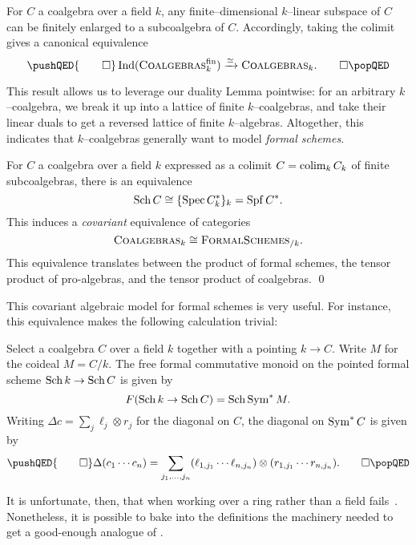 \begin{lemma}\label{kCoalgebrasAreIndFinite}
For \(C\) a coalgebra over a field \(k\), any finite--dimensional \(k\)--linear subspace of \(C\) can be finitely enlarged to a subcoalgebra of \(C\).  Accordingly, taking the colimit gives a canonical equivalence
\[\pushQED{\qed}
\Ind(\CatOf{Coalgebras}_k^{\mathrm{fin}}) \xrightarrow{\simeq} \CatOf{Coalgebras}_k. \qedhere
\popQED\]
\end{lemma}

\noindent This result allows us to leverage our duality Lemma pointwise: for an arbitrary \(k\)--coalgebra, we break it up into a lattice of finite \(k\)--coalgebras, and take their linear duals to get a reversed lattice of finite \(k\)--algebras.  Altogether, this indicates that \(k\)--coalgebras generally want to model \emph{formal schemes}.

\begin{corollary}\label{CoalgsAndFSchsAgreeOverk}
For \(C\) a coalgebra over a field \(k\) expressed as a colimit \(C = \operatorname*{colim}_k C_k\) of finite subcoalgebras, there is an equivalence \[\operatorname{Sch} C \cong \{\operatorname{Spec} C_k^*\}_k = \operatorname{Spf} C^*.\]  This induces a \emph{covariant} equivalence of categories \[\normalfont\textsc{Coalgebras}_k \cong \normalfont\textsc{FormalSchemes}_{/k}.\]  This equivalence translates between the product of formal schemes, the tensor product of pro-algebras, and the tensor product of coalgebras. \qed
\end{corollary}

This covariant algebraic model for formal schemes is very useful.  For instance, this equivalence makes the following calculation trivial:
\begin{lemma}
Select a coalgebra \(C\) over a field \(k\) together with a pointing \(k \to C\).  Write \(M\) for the coideal \(M = C / k\).  The free formal commutative monoid on the pointed formal scheme \(\operatorname{Sch} k \to \operatorname{Sch} C\) is given by \[F(\operatorname{Sch} k \to \operatorname{Sch} C) = \operatorname{Sch} \operatorname{Sym}^* M.\]  Writing \(\Delta c = \sum_j \ell_j \otimes r_j\) for the diagonal on \(C\), the diagonal on \(\operatorname{Sym}^* C\) is given by
\[\pushQED{\qed}
\Delta(c_1 \cdots c_n) = \sum_{j_1, \ldots, j_n} (\ell_{1,j_1} \cdots \ell_{n, j_n}) \otimes (r_{1, j_1} \cdots r_{n, j_n}). \qedhere
\popQED\]
\end{lemma}

It is unfortunate, then, that when working over a ring rather than a field  fails~\cite[Appendix 5.3]{Michaelis}.  Nonetheless, it is possible to bake into the definitions the machinery needed to get a good-enough analogue of .

